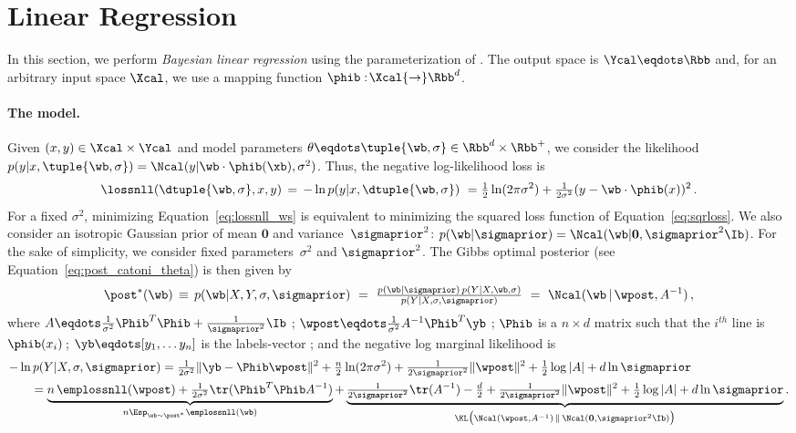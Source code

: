 \documentclass{article}
\theoremstyle{definition}
\theoremstyle{plain}
\begin{document}
\section{Linear Regression}
\label{section:linreg}

In this section, we perform \emph{Bayesian linear regression} using the parameterization of \citet{bishop-2006}.  The output space is $\Ycal\eqdots\Rbb$ and, for an arbitrary input space $\Xcal$, we use a mapping function $\phib:\!\Xcal{\to}\Rbb^d$.  
%

\paragraph{The model.}
Given $(x,y)\in\Xcal\times\Ycal$ and model parameters $\theta\eqdots\tuple{\wb, \sigma}\in\Rbb^d\times\Rbb^+$, we consider the likelihood
%
$p(y|x,\tuple{\wb, \sigma}) = \Ncal(y|\wb\cdot\phib(\xb), \sigma^2)$.
%
%
Thus, the negative log-likelihood loss is
\begin{equation}\label{eq:lossnll_ws}
\lossnll(\dtuple{\wb, \sigma},x,y) \, =\, -\ln{p(y|x,\dtuple{\wb, \sigma})}\
= \tfrac12 \ln(2\pi\sigma^2) + \tfrac1{2\sigma^2} (y - \wb\cdot\phib(x))^2\,.
\end{equation}
For a fixed $\sigma^2$, minimizing Equation~\eqref{eq:lossnll_ws} is equivalent to minimizing the squared loss function of Equation~\eqref{eq:sqrloss}.
%
We also consider an isotropic Gaussian prior of mean $\mathbf0$ and variance~$\sigmaprior^2$:
$p(\wb|\sigmaprior) = \Ncal(\wb|\mathbf0, \sigmaprior^2\Ib)$.
%
%
For the sake of simplicity, we consider fixed parameters~$\sigma^2$ and $\sigmaprior^2$. The Gibbs optimal posterior (see Equation~\ref{eq:post_catoni_theta}) is then given by 
%
%
%
%
%
%
%
%
\begin{equation}\label{eq:post_reg} 
\post^*(\wb) \, \equiv\,  
p(\wb|X,Y,\sigma, \sigmaprior) 
\ = \ 
\tfrac{p(\wb| \sigmaprior)\,p(Y|X,\wb, \sigma)}{p(Y|X,\sigma, \sigmaprior)}%
\ =\ 
\Ncal(\wb\,|\,\wpost, A^{-1})\,,
\end{equation}
where 
%
$A\eqdots\frac1{\sigma^2}\Phib^T\Phib+\frac1{\sigmaprior^2}\Ib$
 ;  $\wpost\eqdots\frac1{\sigma^2}A^{-1}\Phib^T \yb$ 
 ;  $\Phib$ is a $n{\times} d$ matrix such that the $i^{th}$ line is~$\phib(x_i)$\,; 
  $\yb \eqdots [y_1, \ldots y_n]$ is the labels-vector
 ;  and the negative log marginal likelihood is
\begin{align*}
-\ln &\,p(Y|X,\sigma, \sigmaprior)
%
	=
	\tfrac1{2\sigma^2}\|\yb-\Phib\wpost\|^2
	+\tfrac n 2\ln(2\pi \sigma^2)
	+ 
	\tfrac1{2\sigmaprior^2}\|\wpost\|^2
	+ \tfrac12 \log|A|
	+ d\ln\sigmaprior \\
	&=
	\underbrace{
%
%
n\,\emplossnll(\wpost)
		+     \tfrac{1}{2 \sigma^2}  \tr ( \Phib^T \Phib A^{-1})
	}_{n\Esp_{\wb\sim\post^*}\emplossnll(\wb)} 
	{+} 
	\underbrace{
		\tfrac1{2\sigmaprior^2}\tr(A^{-1})
		- \tfrac d2
		+ \tfrac1{2\sigmaprior^2}\|\wpost\|^2
		+ \tfrac12 \log|A|
		+ d\ln\sigmaprior 
	}_{\KL\big(\Ncal(\wpost,A^{-1})\,\|\,\Ncal(\mathbf{0},\sigmaprior^2\Ib)\big)}.
\end{align*}
\end{document}
